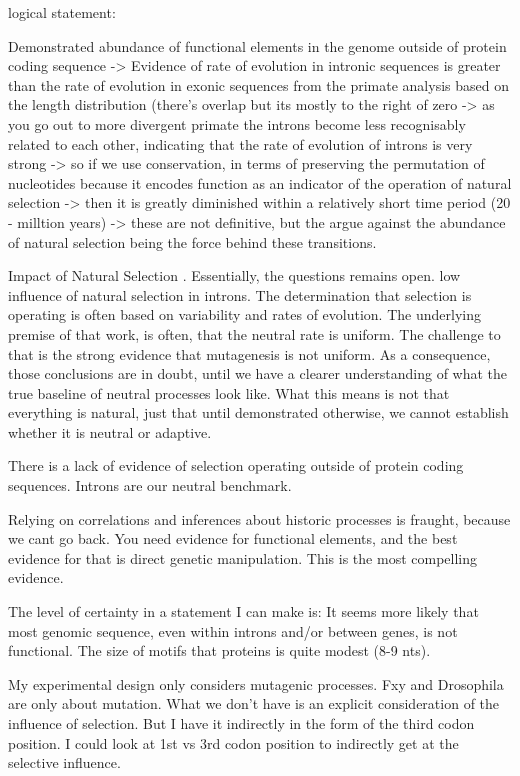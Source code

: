 logical statement: 

Demonstrated abundance of functional elements in the genome outside of protein coding sequence -> Evidence of rate of evolution in intronic sequences is greater than the rate of evolution in exonic sequences from the primate analysis based on the length distribution (there's overlap but its mostly to the right of zero -> as you go out to more divergent primate the introns become less recognisably related to each other, indicating that the rate of evolution of introns is very strong -> so if we use conservation, in terms of preserving the permutation of nucleotides because it encodes function as an indicator of the operation of natural selection -> then it is greatly diminished within a relatively short time period (20 - milltion years) -> these are not definitive, but the argue against the abundance of natural selection being the force behind these transitions.

Impact of Natural Selection \cite{Graur2013OnENCODE}. Essentially, the questions remains open. 
low influence of natural selection in introns. 
The determination that selection is operating is often based on variability and rates of evolution. The underlying premise of that work, is often, that the neutral rate is uniform. The challenge to that is the strong evidence that mutagenesis is not uniform. As a consequence, those conclusions are in doubt, until we have a clearer understanding of what the true baseline of neutral processes look like. What this means is not that everything is natural, just that until demonstrated otherwise, we cannot establish whether it is neutral or adaptive. 

There is a lack of evidence of selection operating outside of protein coding sequences. 
Introns are our neutral benchmark. 

Relying on correlations and inferences about historic processes is fraught, because we cant go back. You need evidence for functional elements, and the best evidence for that is direct genetic manipulation. This is the most compelling evidence.

The level of certainty in a statement I can make is:
It seems more likely that most genomic sequence, even within introns and/or between genes, is not functional. The size of motifs that proteins is quite modest (8-9 nts). 

My experimental design only considers mutagenic processes. Fxy and Drosophila are only about mutation. What we don't have is an explicit consideration of the influence of selection. But I have it indirectly in the form of the third codon position. I could look at 1st vs 3rd codon position to indirectly get at the selective influence. 

